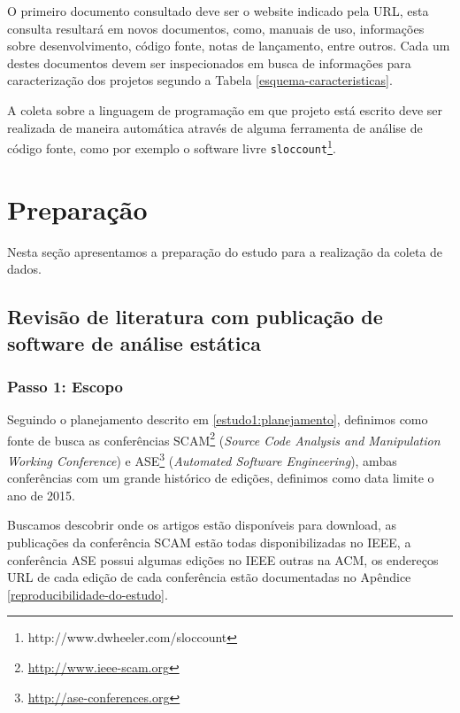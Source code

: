 O primeiro documento consultado deve ser o website indicado pela URL, esta
consulta resultará em novos documentos, como, manuais de uso, informações sobre
desenvolvimento, código fonte, notas de lançamento, entre outros. Cada um
destes documentos devem ser inspecionados em busca de informações para
caracterização dos projetos segundo a Tabela \ref{esquema-caracteristicas}.


A coleta sobre a linguagem de programação em que projeto está escrito deve ser
realizada de maneira automática através de alguma ferramenta de análise de
código fonte, como por exemplo o software livre
\texttt{sloccount}\footnote{http://www.dwheeler.com/sloccount}.


\section{Preparação} \label{estudo1:preparacao} %

Nesta seção apresentamos a preparação do estudo para a realização da coleta de
dados.

\subsection{Revisão de literatura com publicação de software de análise estática}

\subsubsection{Passo 1: Escopo}

Seguindo o planejamento descrito em \ref{estudo1:planejamento}, definimos como
fonte de busca as conferências SCAM\footnote{\url{http://www.ieee-scam.org}}
({\it Source Code Analysis and Manipulation Working Conference}) e
ASE\footnote{\url{http://ase-conferences.org}} ({\it Automated Software
Engineering}), ambas conferências com um grande histórico de edições, definimos
como data limite o ano de 2015.

Buscamos descobrir onde os artigos estão disponíveis para download, as
publicações da conferência SCAM estão todas disponibilizadas no IEEE, a
conferência ASE possui algumas edições no IEEE outras na ACM, os endereços URL
de cada edição de cada conferência estão documentadas no Apêndice
\ref{reproducibilidade-do-estudo}.

